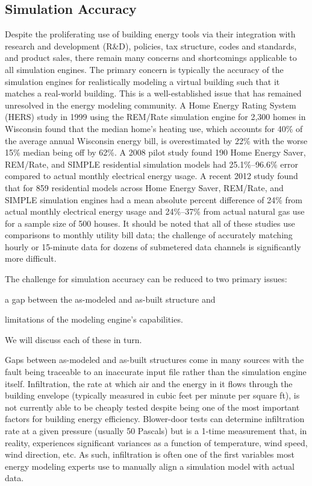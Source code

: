 \documentclass[preprint, review, 12pt]{elsarticle}
\begin{document}
\subsection{Simulation Accuracy}
Despite the proliferating use of building energy tools via their integration with research and development (R\&D), policies, tax structure, codes and standards, and product sales, there remain many concerns and shortcomings applicable to all simulation engines. The primary concern is typically the accuracy of the simulation engines for realistically modeling a virtual building such that it matches a real-world building. This is a well-established issue that has remained unresolved in the energy modeling community. A Home Energy Rating System (HERS) study in 1999 \cite{cit:pigg2001} using the REM/Rate
simulation engine for 2,300 homes in Wisconsin found that the median home's heating use, which accounts for 40\% of the average annual Wisconsin energy bill, is overestimated by 22\% with the worse 15\% median being off by 62\%. A 2008 pilot study \cite{cit:earthadvantage2009} found 190 Home Energy Saver, REM/Rate, and SIMPLE residential simulation models had 25.1\%--96.6\% error compared to actual monthly electrical energy usage. A recent 2012 study \cite{cit:roberts2012} found that for 859 residential models across Home Energy Saver, REM/Rate, and SIMPLE simulation engines had a mean absolute percent difference of 24\% from actual monthly electrical energy usage and 24\%--37\% from actual natural gas use for a sample size of 500 houses. It should be noted that all of these studies use comparisons to monthly utility bill data; the challenge of accurately matching hourly or 15-minute data for dozens of submetered data channels is significantly more difficult.

The challenge for simulation accuracy can be reduced to two primary issues: \begin{inparaenum}[1)]
\item a gap between the as-modeled and as-built structure and 
\item limitations of the modeling engine's capabilities. 
\end{inparaenum}
We will discuss each of these in turn.

Gaps between as-modeled and as-built structures come in many sources with the fault being traceable to an inaccurate input file rather than the simulation engine itself. Infiltration, the rate at which air and the energy in it flows through the building envelope (typically measured in cubic feet per minute per square ft), is not currently able to be cheaply tested despite being one of the most important factors for building energy efficiency. Blower-door tests can determine infiltration rate at a given pressure (usually 50 Pascals) but is a 1-time measurement that, in reality, experiences significant variances as a function of temperature, wind speed, wind direction, etc. As such, infiltration is often one of the first variables most energy modeling experts use to manually align a simulation model with actual data.
\end{document}
